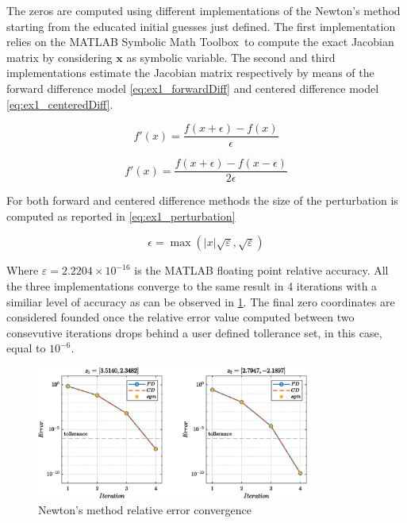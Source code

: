 \documentclass[11pt,a4paper,oneside]{article}
\renewcommand{\vec}[1]{\mathbf{#1}}
\begin{document}
The zeros are computed using different implementations of the Newton's method starting from the educated initial guesses just defined.
The first implementation relies on the MATLAB Symbolic Math Toolbox\texttrademark\, to compute the exact Jacobian matrix by considering $\vec{x}$ as symbolic variable.
The second and third implementations estimate the Jacobian matrix respectively by means of the forward difference model \cref{eq:ex1_forwardDiff} and centered difference model \cref{eq:ex1_centeredDiff}.

\begin{equation}
    f'(x) = \frac{f(x + \epsilon) - f(x)}{\epsilon}
    \label{eq:ex1_forwardDiff}
\end{equation}

\begin{equation}
    f'(x) = \frac{f(x + \epsilon) - f(x - \epsilon)}{2 \epsilon}
    \label{eq:ex1_centeredDiff}
\end{equation}

For both forward and centered difference methods the size of the perturbation is computed as reported in \cref{eq:ex1_perturbation} 

\begin{equation}
    \epsilon = \max (\left\lvert x \right\rvert\sqrt{\varepsilon}, \sqrt{\varepsilon})
    \label{eq:ex1_perturbation}
\end{equation}

Where $\varepsilon=2.2204\times10^{-16}$ is the MATLAB floating point relative accuracy.
\clearpage
All the three implementations converge to the same result in 4 iterations with a similiar level of accuracy as can be observed in \cref{fig:ex1_convergence}.
The final zero coordinates are considered founded once the relative error value computed between two consevutive iterations drops behind a user defined tollerance set, in this case, equal to $10^{-6}$.

\begin{figure}[htb]
    \centering
    \includegraphics*[width=0.8\textwidth, keepaspectratio]{ex1_convergence.eps}
    \caption[]{\label{fig:ex1_convergence} Newton's method relative error convergence}
\end{figure}
\end{document}
